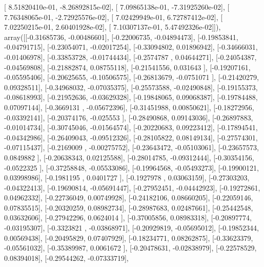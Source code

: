 \documentclass{article}
\begin{document}
       [  8.51820410e-01,  -8.26892815e-02],
       [  7.09865138e-01,  -7.31925260e-02],
       [  7.76348065e-01,  -2.72925576e-02],
       [  7.02429949e-01,   6.72787412e-02],
       [  7.02250215e-01,   2.60401928e-02],
       [  7.10307137e-01,   5.47492326e-02]]), array([[-0.31685736, -0.00486601],
       [-0.22006735, -0.04894473],
       [-0.19853841, -0.04791715],
       [-0.23054071, -0.02017254],
       [-0.33094802,  0.01896942],
       [-0.34666031, -0.01406978],
       [-0.33853728, -0.01744434],
       [-0.2574787 ,  0.04644271],
       [-0.24054387, -0.04569808],
       [-0.21882874,  0.08755118],
       [-0.21541556,  0.031643  ],
       [-0.19207161, -0.05595406],
       [-0.20625655, -0.10506575],
       [-0.26813679, -0.0751071 ],
       [-0.21420279,  0.09328511],
       [-0.34968032, -0.07035375],
       [-0.25573588, -0.02490848],
       [-0.19155373, -0.08618993],
       [-0.21952636, -0.03629328],
       [-0.19848065,  0.09068387],
       [-0.19784488,  0.07097144],
       [-0.3669131 , -0.05672396],
       [-0.31451988,  0.00850621],
       [-0.18272956, -0.03392141],
       [-0.20374176, -0.025553  ],
       [-0.28490868,  0.09143036],
       [-0.26897883, -0.01014734],
       [-0.30745046, -0.01564574],
       [-0.20220683,  0.09223412],
       [-0.17894541, -0.04342986],
       [-0.26409043, -0.09512326],
       [-0.28105822,  0.08149134],
       [-0.27574301, -0.07115437],
       [-0.2169009 , -0.00275752],
       [-0.23643472, -0.05103061],
       [-0.23657573,  0.0849882 ],
       [-0.20638343,  0.02125588],
       [-0.28014785, -0.09312444],
       [-0.30354156, -0.0522325 ],
       [-0.37258848, -0.05533086],
       [-0.19964568, -0.05493273],
       [-0.19900121,  0.03998986],
       [-0.1981195 ,  0.0401727 ],
       [-0.1927978 ,  0.03063159],
       [-0.27303203, -0.04322413],
       [-0.19690814, -0.05691447],
       [-0.27952451, -0.04442923],
       [-0.19272861,  0.04962332],
       [-0.22736049,  0.00749928],
       [-0.24182106,  0.08660205],
       [-0.22059146,  0.07835515],
       [-0.20320259,  0.08982734],
       [-0.28987683,  0.02487661],
       [-0.25442548,  0.03632606],
       [-0.27942296,  0.0624014 ],
       [-0.37005856,  0.08983318],
       [-0.20897774, -0.03195307],
       [-0.3323821 , -0.03868971],
       [-0.20929819, -0.05695012],
       [-0.19852344,  0.00569438],
       [-0.20495829,  0.07407929],
       [-0.18234771,  0.08262875],
       [-0.33623379, -0.05561032],
       [-0.35389987,  0.0061672 ],
       [-0.20478631, -0.02838979],
       [-0.22578529,  0.08394018],
       [-0.29544262, -0.07333719],
\end{document}
